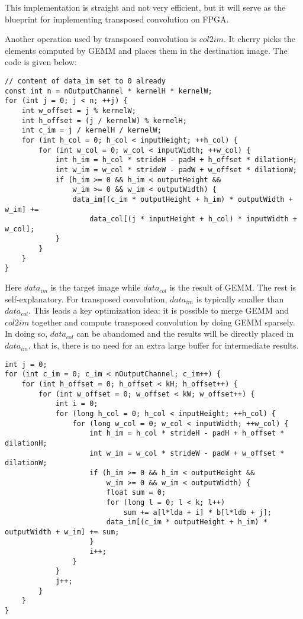 This implementation is straight and not very efficient, but it will serve as the blueprint for implementing
transposed convolution on FPGA.

Another operation used by transposed convolution is $col2im$. It cherry picks the elements computed by GEMM
and places them in the destination image. The code is given below:

\begin{code}
\begin{verbatim}
// content of data_im set to 0 already
const int n = nOutputChannel * kernelH * kernelW;
for (int j = 0; j < n; ++j) {
    int w_offset = j % kernelW;
    int h_offset = (j / kernelW) % kernelH;
    int c_im = j / kernelH / kernelW;
    for (int h_col = 0; h_col < inputHeight; ++h_col) {
        for (int w_col = 0; w_col < inputWidth; ++w_col) {
            int h_im = h_col * strideH - padH + h_offset * dilationH;
            int w_im = w_col * strideW - padW + w_offset * dilationW;
            if (h_im >= 0 && h_im < outputHeight &&
                w_im >= 0 && w_im < outputWidth) {
                data_im[(c_im * outputHeight + h_im) * outputWidth + w_im] +=
                    data_col[(j * inputHeight + h_col) * inputWidth + w_col];
            }
        }
    }
}
\end{verbatim}
\label{code:col2im}
\end{code}

Here $data_{im}$ is the target image while $data_{col}$ is the result of GEMM. The rest is self-explanatory.
For transposed convolution, $data_{im}$ is typically smaller than $data_{col}$. This leads a key optimization
idea: it is possible to merge GEMM and $col2im$ together and compute transposed convolution by doing GEMM
sparsely. In doing so, $data_{col}$ can be abandomed and the results will be directly placed in $data_{im}$,
that is, there is no need for an extra large buffer for intermediate results.

\begin{code}
\begin{verbatim}
int j = 0;
for (int c_im = 0; c_im < nOutputChannel; c_im++) {
    for (int h_offset = 0; h_offset < kH; h_offset++) {
        for (int w_offset = 0; w_offset < kW; w_offset++) {
            int i = 0;
            for (long h_col = 0; h_col < inputHeight; ++h_col) {
                for (long w_col = 0; w_col < inputWidth; ++w_col) {
                    int h_im = h_col * strideH - padH + h_offset * dilationH;
                    int w_im = w_col * strideW - padW + w_offset * dilationW;
                    if (h_im >= 0 && h_im < outputHeight &&
                        w_im >= 0 && w_im < outputWidth) {
                        float sum = 0;
                        for (long l = 0; l < k; l++)
                            sum += a[l*lda + i] * b[l*ldb + j];
                        data_im[(c_im * outputHeight + h_im) * outputWidth + w_im] += sum;
                    }
                    i++;
                }
            }
            j++;
        }
    }
}
\end{verbatim}
\label{code:transposed_convolution}
\end{code}

\clearpage %
